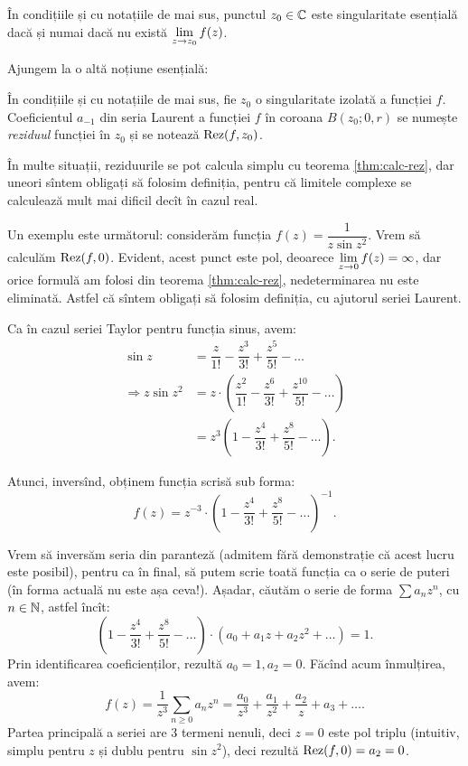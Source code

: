 \begin{proposition}\label{pr:sing-es}
  În condițiile și cu notațiile de mai sus, punctul $ z_0 \in \mathbb{C} $ este
  singularitate esențială dacă și numai dacă nu există
  $ \displaystyle\lim_{z \to z_0} f(z) $.
\end{proposition}

Ajungem la o altă noțiune esențială:
\begin{definition}\label{def:rez}
  În condițiile și cu notațiile de mai sus, fie $ z_0 $ o singularitate
  izolată a funcției $ f $. Coeficientul $ a_{-1} $ din seria Laurent
  a funcției $ f $ în coroana $ B(z_0; 0, r) $ se numește
  \emph{reziduul} funcției în $ z_0 $ și se notează $ \mathrm{Rez}(f,z_0) $.
\end{definition}

\begin{remark}\label{rk:calcul-rez}
  În multe situații, reziduurile se pot calcula simplu cu teorema \ref{thm:calc-rez},
  dar uneori sîntem obligați să folosim definiția, pentru că limitele complexe
  se calculează mult mai dificil decît în cazul real.
\end{remark}

Un exemplu este următorul: considerăm funcția $ f(z) = \dfrac{1}{z \sin z^2} $.
Vrem să calculăm $ \mathrm{Rez}(f, 0) $. Evident, acest punct este pol, deoarece
$ \displaystyle\lim_{z \to 0} f(z) = \infty $, dar orice formulă am folosi din
teorema \ref{thm:calc-rez}, nedeterminarea nu este eliminată. Astfel că sîntem
obligați să folosim definiția, cu ajutorul seriei Laurent.

Ca în cazul seriei Taylor pentru funcția sinus, avem:
\begin{align*}
  \sin z &= \dfrac{z}{1!} - \dfrac{z^3}{3!} + \dfrac{z^5}{5!} - \dots \\
  \Rightarrow z \sin z^2 &= z \cdot \left( \dfrac{z^2}{1!} - \dfrac{z^6}{3!} + \dfrac{z^{10}}{5!} - \dots \right) \\
         &= z^3 \left( 1 - \dfrac{z^4}{3!} + \dfrac{z^8}{5!} - \dots \right).
\end{align*}

Atunci, inversînd, obținem funcția scrisă sub forma:
\[
  f(z) = z^{-3} \cdot \left( 1 - \dfrac{z^4}{3!} + \dfrac{z^8}{5!} - \dots \right)^{-1}.
\]

Vrem să inversăm seria din paranteză (admitem fără demonstrație că acest lucru
este posibil), pentru ca în final, să putem scrie toată funcția ca o serie de
puteri (în forma actuală nu este așa ceva!). Așadar, căutăm o serie de forma
$ \sum a_n z^n $, cu $ n \in \mathbb{N} $, astfel încît:
\[
  \left( 1 - \dfrac{z^4}{3!} + \dfrac{z^8}{5!} - \dots \right) \cdot %
  \left(a_0 + a_1 z + a_2 z^2 + \dots \right) = 1.
\]
Prin identificarea coeficienților, rezultă $ a_0 = 1, a_2 = 0 $. Făcînd acum
înmulțirea, avem:
\[
  f(z) = \dfrac{1}{z^3} \sum_{n \geq 0} a_n z^n = %
  \dfrac{a_0}{z^3} + \dfrac{a_1}{z^2} + \dfrac{a_2}{z} + a_3 + \dots.
\]
Partea principală a seriei are 3 termeni nenuli, deci $ z = 0 $ este pol triplu
(intuitiv, simplu pentru $ z $ și dublu pentru $ \sin z^2 $), deci rezultă
$ \mathrm{Rez}(f, 0) = a_2 = 0 $.

